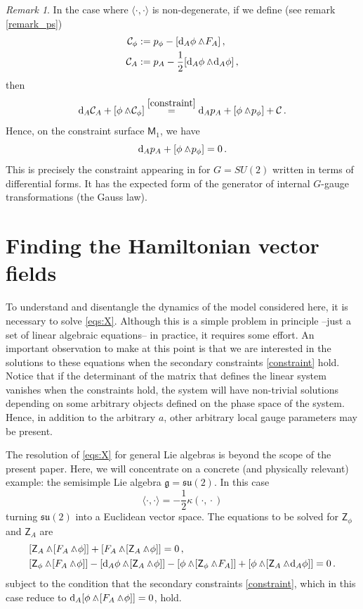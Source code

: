 \documentclass[12pt]{amsart}
\theoremstyle{plain}
\theoremstyle{definition}
\theoremstyle{remark}
\newtheorem{remark}[theorem]{Remark}
\newcommand{\wed}{\wedge\hspace*{-7.5pt}.\hspace*{3pt}}
\numberwithin{equation}{section}  %
\begin{document}
\begin{remark} 
In the case where \(\langle \cdot,\!\cdot\rangle\) is non-degenerate, if we define (see remark \ref{remark_ps})
\begin{align*}
    \mathcal{C}_\phi&:=p_\phi-[\mathrm{d}_A\phi\wed F_A]\,,\\
    \mathcal{C}_A&:=p_A-\frac{1}{2}[\mathrm{d}_A\phi\wed \mathrm{d}_A\phi]\,,
\end{align*}
then 
\[
\mathrm{d}_A\mathcal{C}_A+[\phi\wed \mathcal{C}_\phi]\overset{\eqref{constraint}}{=}\mathrm{d}_Ap_A+[\phi\wed p_\phi]+\mathcal{C}\,.
\]
Hence, on the constraint surface $\mathsf{M}_1$, we have
\[\mathrm{d}_Ap_A+[\phi\wed p_\phi]=0\,.\]
This is precisely the constraint appearing in \cite{HM} for $G=SU(2)$ written in terms of differential forms. It has the expected form of the generator of internal $G$-gauge transformations (the Gauss law).
\end{remark}

%
%
\section{Finding the Hamiltonian vector fields}{\label{sec_ham_vector_fields}}

To understand and disentangle the dynamics of the model considered here, it is necessary to solve \eqref{eqs:X}. Although this is a simple problem in principle --just a set of linear algebraic equations-- in practice, it requires some effort. An important observation to make at this point is that we are interested in the solutions to these equations when the secondary constraints \eqref{constraint} hold. Notice that if the determinant of the matrix that defines the linear system vanishes when the constraints hold, the system will have non-trivial solutions depending on some arbitrary objects defined on the phase space of the system. Hence, in addition to the arbitrary $a$, other arbitrary local gauge parameters may be present.

The resolution of \eqref{eqs:X} for general Lie algebras is beyond the scope of the present paper. Here, we will concentrate on a concrete (and physically relevant) example: the semisimple Lie algebra $\mathfrak{g}=\mathfrak{su}(2)$. In this case \[\langle \cdot,\!\cdot \rangle =-\frac{1}{2}\kappa(\cdot,\!\cdot) \] 
turning \(\mathfrak{su}(2)\) into a Euclidean vector space. The equations to be solved for $\mathsf{Z}_\phi$ and $\mathsf{Z}_A$ are
\begin{subequations}
\begin{align}
  & [\mathsf{Z}_A\wed[F_A\wed\phi]]+[F_A\wed[\mathsf{Z}_A\wed\phi]]=0\,, \label{eeeq1}\\
  & [\mathsf{Z}_\phi\wed [F_A\wed\phi]]-[\mathrm{d}_A\phi\wed[\mathsf{Z}_A\wed\phi ]]-[\phi\wed[\mathsf{Z}_\phi\wed F_A]] +[\phi\wed[\mathsf{Z}_A\wed \mathrm{d}_A\phi]]=0\label{eeeq2}\,.
\end{align}
\end{subequations}
subject to the condition that the secondary constraints \eqref{constraint}, which in this case reduce to $\mathrm{d}_A[\phi\wed[F_A\wed\phi]]=0$, hold.
\end{document}
